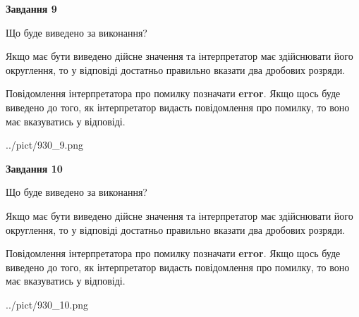\documentclass[12pt, ukrainian]{article}
\begin{document}
{\begin {Large}
{\begin {center}\textbf{Завдання 9}\end {center}}\par
Що буде виведено за виконання? \par

Якщо має бути виведено дійсне значення та інтерпретатор має здійснювати його округлення, 
то у відповіді достатньо правильно вказати два дробових розряди.

Повідомлення інтерпретатора про помилку позначати \textbf{error}.
Якщо щось буде виведено до того, як інтерпретатор видасть повідомлення про помилку, 
то воно має вказуватись у відповіді. \par

\begin{center}
	{../pict/930_9.png}
\end{center}
\newpage

{\begin {center}\textbf{Завдання 10}\end {center}}\par
Що буде виведено за виконання? \par

Якщо має бути виведено дійсне значення та інтерпретатор має здійснювати його округлення, 
то у відповіді достатньо правильно вказати два дробових розряди.

Повідомлення інтерпретатора про помилку позначати \textbf{error}.
Якщо щось буде виведено до того, як інтерпретатор видасть повідомлення про помилку, 
то воно має вказуватись у відповіді. \par

\begin{center}
	{../pict/930_10.png}
\end{center}
\newpage

\end {Large}}
\end{document}
